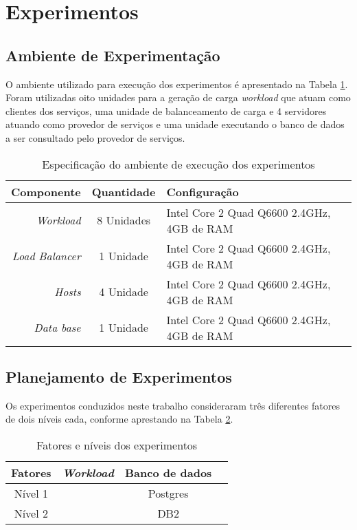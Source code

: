\section{Experimentos}
\subsection{Ambiente de Experimentação}
O ambiente utilizado para execução dos experimentos é apresentado na Tabela \ref{tab:configuracao_maquinas}.
Foram utilizadas oito unidades para a geração de carga \textit{workload} que atuam como clientes dos
serviços, uma unidade de balanceamento de carga e 4 servidores atuando como provedor de serviços e uma
unidade executando o banco de dados a ser consultado pelo provedor de serviços.

\begin{table}[htb]
	\centering
	\caption{Especificação do ambiente de execução dos experimentos}
	\label{tab:configuracao_maquinas}
	\begin{tabularx}{\textwidth}{r|c|X} \hline\hline
		\textbf{Componente}    & \textbf{Quantidade} & \textbf{Configuração} \\ \hline
		\textit{Workload}      & 8 Unidades          & Intel Core 2 Quad Q6600 2.4GHz, 4GB de RAM \\
		\textit{Load Balancer} & 1 Unidade           & Intel Core 2 Quad Q6600 2.4GHz, 4GB de RAM \\
		\textit{Hosts}         & 4 Unidade           & Intel Core 2 Quad Q6600 2.4GHz, 4GB de RAM \\
		\textit{Data base}     & 1 Unidade           & Intel Core 2 Quad Q6600 2.4GHz, 4GB de RAM \\
		\hline
	\end{tabularx}
	\fdadospesquisa
\end{table}


\subsection{Planejamento de Experimentos}
Os experimentos conduzidos neste trabalho consideraram três diferentes fatores de dois níveis cada, conforme aprestando na Tabela \ref{tab:fatores_niveis}. 

\begin{table}[htb]
	\centering
	\caption{Fatores e níveis dos experimentos}
	\label{tab:fatores_niveis}
	\begin{tabularx}{\textwidth}{c|c|c|c} \hline\hline
        Fatores  & \textit{Workload} & Banco de dados \\ \hline
		Nível 1  &         			 & Postgres \\
		Nível 2  &            		 & DB2 \\
		\hline
	\end{tabularx}
	\fdadospesquisa
\end{table}


